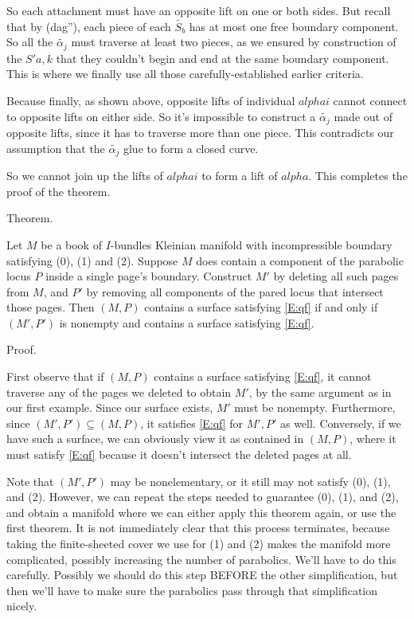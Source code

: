 \documentclass[12pt]{amsart}
\theoremstyle{definition}
\theoremstyle{remark}
\newcommand{\cin}{\subseteq}
\begin{document}
So each attachment must have an opposite lift on one or both sides. But recall
that by (dag''), each piece of each $\widetilde{S_b}$ has at most one free boundary
component. So all the $\widetilde{\alpha_j}$ must traverse at least two pieces, as we
ensured by construction of the $S'a,k$ that they couldn't begin and end at the
same boundary component. This is where we finally use all those
carefully-established earlier criteria.

Because finally, as shown above, opposite lifts of individual $alphai$ cannot
connect to opposite lifts on either side. So it's impossible to construct
a $\widetilde{\alpha_j}$ made out of opposite lifts, since it has to traverse more than
one piece.  This contradicts our assumption that the $\widetilde{\alpha_j}$ glue to form
a closed curve.

So we cannot join up the lifts of $alphai$ to form a lift of $alpha$. This
completes the proof of the theorem.


Theorem.


Let $M$ be a book of $I$-bundles Kleinian manifold with incompressible boundary
satisfying (0), (1) and (2). Suppose $M$ does contain a component of the
parabolic locus $P$ inside a single page's boundary. Construct $M'$ by deleting
all such pages from $M$, and $P'$ by removing all components of the pared locus
that intersect those pages. Then $(M,P)$ contains a surface satisfying \eqref{E:qf} if
and only if $(M',P')$ is nonempty and contains a surface satisfying \eqref{E:qf}.

Proof.

First observe that if $(M,P)$ contains a surface satisfying \eqref{E:qf}, it cannot
traverse any of the pages we deleted to obtain $M'$, by the same argument as in
our first example.  Since our surface exists, $M'$ must be nonempty.
Furthermore, since $(M',P') \cin (M,P)$, it satisfies \eqref{E:qf} for $M',P'$ as well.
Conversely, if we have such a surface, we can obviously view it as contained in
$(M,P)$, where it must satisfy \eqref{E:qf} because it doesn't intersect the deleted
pages at all.

Note that $(M',P')$ may be nonelementary, or it still may not satisfy (0), (1),
and (2).  However, we can repeat the steps needed to guarantee (0), (1), and
(2), and obtain a manifold where we can either apply this theorem again, or use
the first theorem. It is not immediately clear that this process terminates,
because taking the finite-sheeted cover we use for (1) and (2) makes the
manifold more complicated, possibly increasing the number of parabolics. We'll
have to do this carefully. Possibly we should do this step BEFORE the other
simplification, but then we'll have to make sure the parabolics pass through
that simplification nicely.
\end{document}
